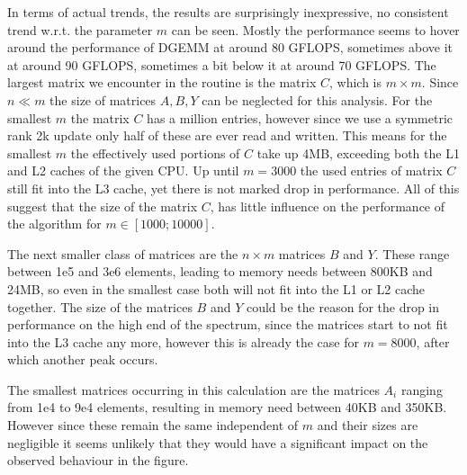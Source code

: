 \documentclass{scrartcl}
\begin{document}
In terms of actual trends, the results are surprisingly inexpressive, no consistent trend w.r.t. the parameter $m$ can be seen.
Mostly the performance seems to hover around the performance of DGEMM at around 80 GFLOPS, sometimes above it at around 90 GFLOPS, sometimes a bit below it at around 70 GFLOPS.
The largest matrix we encounter in the routine is the matrix $C$, which is $m \times m$.
Since $n \ll m$ the size of matrices $A,B,Y$ can be neglected for this analysis.
For the smallest $m$ the matrix $C$ has a million entries, however since we use a symmetric rank 2k update only half of these are ever read and written.
This means for the smallest $m$ the effectively used portions of $C$ take up 4MB, exceeding both the L1 and L2 caches of the given CPU.
Up until $m=3000$ the used entries of matrix $C$ still fit into the L3 cache, yet there is not marked drop in performance.
All of this suggest that the size of the matrix $C$, has little influence on the performance of the algorithm for $m \in [1000;10000]$.

The next smaller class of matrices are the $n \times m$ matrices $B$ and $Y$.
These range between 1e5 and 3e6 elements, leading to memory needs between 800KB and 24MB, so even in the smallest case both will not fit into the L1 or L2 cache together.
The size of the matrices $B$ and $Y$ could be the reason for the drop in performance on the high end of the spectrum, since the matrices start to not fit into the L3 cache any more, however this is already the case for $m=8000$, after which another peak occurs.

The smallest matrices occurring in this calculation are the matrices $A_i$ ranging from 1e4 to 9e4 elements, resulting in memory need between 40KB and 350KB.
However since these remain the same independent of $m$ and their sizes are negligible it seems unlikely that they would have a significant impact on the observed behaviour in the figure.
\end{document}
